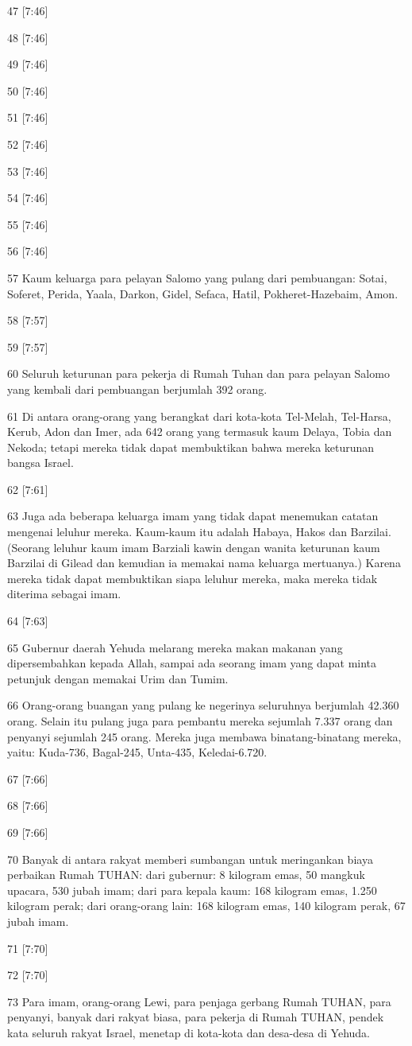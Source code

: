 \par 47 [7:46]
\par 48 [7:46]
\par 49 [7:46]
\par 50 [7:46]
\par 51 [7:46]
\par 52 [7:46]
\par 53 [7:46]
\par 54 [7:46]
\par 55 [7:46]
\par 56 [7:46]
\par 57 Kaum keluarga para pelayan Salomo yang pulang dari pembuangan: Sotai, Soferet, Perida, Yaala, Darkon, Gidel, Sefaca, Hatil, Pokheret-Hazebaim, Amon.
\par 58 [7:57]
\par 59 [7:57]
\par 60 Seluruh keturunan para pekerja di Rumah Tuhan dan para pelayan Salomo yang kembali dari pembuangan berjumlah 392 orang.
\par 61 Di antara orang-orang yang berangkat dari kota-kota Tel-Melah, Tel-Harsa, Kerub, Adon dan Imer, ada 642 orang yang termasuk kaum Delaya, Tobia dan Nekoda; tetapi mereka tidak dapat membuktikan bahwa mereka keturunan bangsa Israel.
\par 62 [7:61]
\par 63 Juga ada beberapa keluarga imam yang tidak dapat menemukan catatan mengenai leluhur mereka. Kaum-kaum itu adalah Habaya, Hakos dan Barzilai. (Seorang leluhur kaum imam Barziali kawin dengan wanita keturunan kaum Barzilai di Gilead dan kemudian ia memakai nama keluarga mertuanya.) Karena mereka tidak dapat membuktikan siapa leluhur mereka, maka mereka tidak diterima sebagai imam.
\par 64 [7:63]
\par 65 Gubernur daerah Yehuda melarang mereka makan makanan yang dipersembahkan kepada Allah, sampai ada seorang imam yang dapat minta petunjuk dengan memakai Urim dan Tumim.
\par 66 Orang-orang buangan yang pulang ke negerinya seluruhnya berjumlah 42.360 orang. Selain itu pulang juga para pembantu mereka sejumlah 7.337 orang dan penyanyi sejumlah 245 orang. Mereka juga membawa binatang-binatang mereka, yaitu: Kuda-736, Bagal-245, Unta-435, Keledai-6.720.
\par 67 [7:66]
\par 68 [7:66]
\par 69 [7:66]
\par 70 Banyak di antara rakyat memberi sumbangan untuk meringankan biaya perbaikan Rumah TUHAN: dari gubernur: 8 kilogram emas, 50 mangkuk upacara, 530 jubah imam; dari para kepala kaum: 168 kilogram emas, 1.250 kilogram perak; dari orang-orang lain: 168 kilogram emas, 140 kilogram perak, 67 jubah imam.
\par 71 [7:70]
\par 72 [7:70]
\par 73 Para imam, orang-orang Lewi, para penjaga gerbang Rumah TUHAN, para penyanyi, banyak dari rakyat biasa, para pekerja di Rumah TUHAN, pendek kata seluruh rakyat Israel, menetap di kota-kota dan desa-desa di Yehuda.

